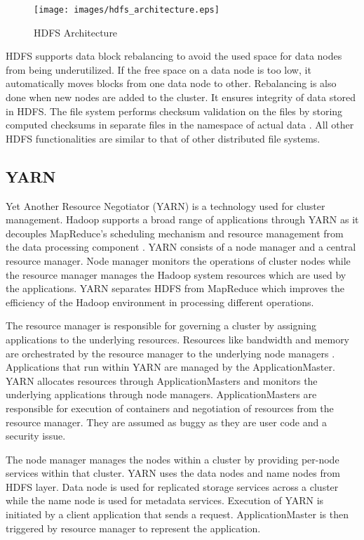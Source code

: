 \documentclass[9pt,twocolumn,twoside]{../../styles/osajnl}
\begin{document}
\begin{figure}[ht]
  \texttt{[image: images/hdfs\_architecture.eps]}
  \caption{HDFS Architecture} \cite{hdfsArch}
\end{figure}

HDFS supports data block rebalancing to avoid the used space for data
nodes from being underutilized. If the free space on a data node is
too low, it automatically moves blocks from one data node to
other. Rebalancing is also done when new nodes are added to the
cluster. It ensures integrity of data stored in HDFS. The file system
performs checksum validation on the files by storing computed
checksums in separate files in the namespace of actual data
\cite{hdfsIbm}. All other HDFS functionalities are similar to that of
other distributed file systems.



\subsection{YARN}

Yet Another Resource Negotiator (YARN) is a technology used for
cluster management. Hadoop supports a broad range of applications
through YARN as it decouples MapReduce’s scheduling mechanism and
resource management from the data processing component
\cite{yarnDef}. YARN consists of a node manager and a central resource
manager. Node manager monitors the operations of cluster nodes while
the resource manager manages the Hadoop system resources which are
used by the applications. YARN separates HDFS from MapReduce which
improves the efficiency of the Hadoop environment in processing
different operations.

The resource manager is responsible for governing a cluster by
assigning applications to the underlying resources. Resources like
bandwidth and memory are orchestrated by the resource manager to the
underlying node managers \cite{yarnIbm}. Applications that run within
YARN are managed by the ApplicationMaster. YARN allocates resources
through ApplicationMasters and monitors the underlying applications
through node managers. ApplicationMasters are responsible for
execution of containers and negotiation of resources from the resource
manager. They are assumed as buggy as they are user code and a
security issue.

The node manager manages the nodes within a cluster by providing
per-node services within that cluster. YARN uses the data nodes and
name nodes from HDFS layer. Data node is used for replicated storage
services across a cluster while the name node is used for metadata
services. Execution of YARN is initiated by a client application that
sends a request. ApplicationMaster is then triggered by resource
manager to represent the application.
\end{document}
